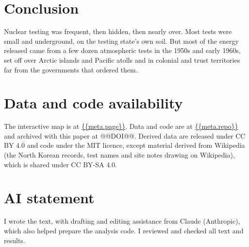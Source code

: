 \documentclass[11pt,a4paper]{article}
\begin{document}
\section{Conclusion}
Nuclear testing was frequent, then hidden, then nearly over. Most tests were small and underground, on the testing state's own soil. But most of the energy released came from a few dozen atmospheric tests in the 1950s and early 1960s, set off over Arctic islands and Pacific atolls and in colonial and trust territories far from the governments that ordered them.

\section*{Data and code availability}
The interactive map is at \url{{{meta.page}}}. Data and code are at \url{{{meta.repo}}} and archived with this paper at @@DOI@@. Derived data are released under CC BY 4.0 and code under the MIT licence, except material derived from Wikipedia (the North Korean records, test names and site notes drawing on Wikipedia), which is shared under CC BY-SA 4.0.

\section*{AI statement}
I wrote the text, with drafting and editing assistance from Claude (Anthropic), which also helped prepare the analysis code. I reviewed and checked all text and results.
\end{document}
